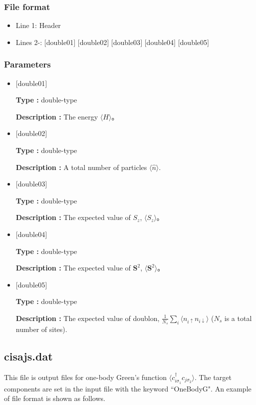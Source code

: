 \subsubsection{File format}
 \begin{itemize}
   \item Line 1: Header
   \item Lines 2-: $[$double01$]$ $[$double02$]$ $[$double03$]$ $[$double04$]$ $[$double05$]$
  \end{itemize}
\subsubsection{Parameters}
 \begin{itemize}

  \item  $[$double01$]$
  
 {\bf Type :} double-type

{\bf Description :} The energy $\langle H\rangle$。
 
  \item $[$double02$]$

 {\bf Type :} double-type 

{\bf Description :}  A total number of particles $\langle \hat{n}\rangle$.

  \item $[$double03$]$

 {\bf Type :} double-type 

{\bf Description :}  The expected value of $S_z$, $\langle S_z\rangle$。

  \item $[$double04$]$

 {\bf Type :} double-type 

{\bf Description :}  The expected value of ${\bm S^2}$, $\langle {\bm S^2}\rangle$。

  \item $[$double05$]$

 {\bf Type :} double-type 

{\bf Description :}  The expected value of doublon, 
$\frac{1}{N_s} \sum_{i}\langle n_{i\uparrow}n_{i\downarrow}\rangle$ ($N_{s}$ is a total number of sites).


 \end{itemize}

\newpage
\subsection{cisajs.dat}
\label{Subsec:cgcisajs}
This file is output files for one-body Green's function $\langle c_{i\sigma_1}^{\dagger}c_{j\sigma_2}\rangle$. 
The target components are set in the input file with the keyword ``OneBodyG".
An example of file format is shown as follows.


